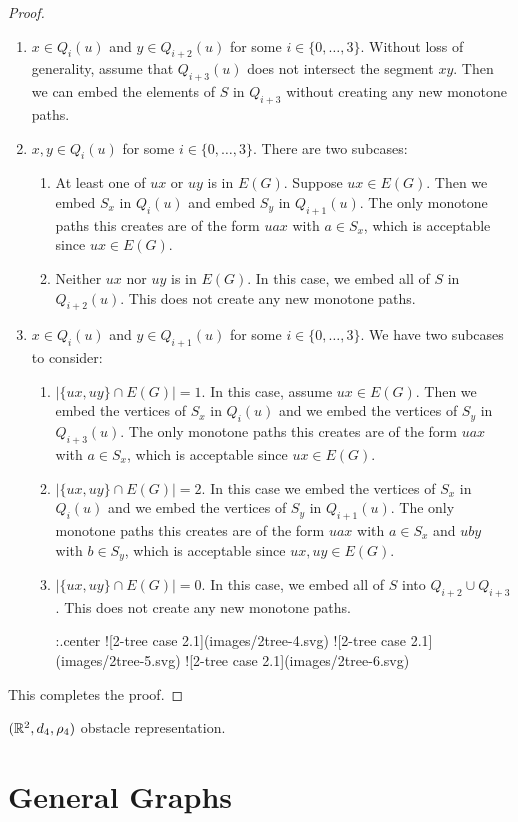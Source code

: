 \documentclass{patmorin}
\begin{document}
\begin{proof}
  \begin{enumerate}

  \item  $x\in Q_i(u)$ and $y\in Q_{i+2}(u)$ for some
  $i\in\{0,\ldots,3\}$. Without loss of generality, assume that
  $Q_{i+3}(u)$ does not intersect the segment $xy$. Then we can embed the
  elements of $S$ in $Q_{i+3}$ without creating any new monotone paths.

  \item $x,y\in Q_i(u)$ for some $i\in\{0,\ldots,3\}$. There are two subcases:
    \begin{enumerate}
    \item At least one of $ux$ or $uy$ is in $E(G)$. Suppose $ux\in E(G)$.  Then we embed $S_x$ in $Q_i(u)$ and embed $S_y$ in $Q_{i+1}(u)$.  The only monotone paths this creates are of the form $uax$ with $a\in S_x$, which is acceptable since $ux\in E(G)$.
    \item Neither $ux$ nor $uy$ is in $E(G)$. In this case, we embed all of $S$ in $Q_{i+2}(u)$.  This does not create any new monotone paths.
  \end{enumerate}

  \item $x\in Q_i(u)$ and $y\in Q_{i+1}(u)$ for some $i\in\{0,\ldots,3\}$.  We have two subcases to consider:
  \begin{enumerate}
    \item $|\{ux,uy\}\cap E(G)|=1$.  In this case, assume $ux\in E(G)$. Then we embed the vertices of $S_x$ in $Q_i(u)$ and we embed the vertices of $S_y$ in $Q_{i+3}(u)$.  The only monotone paths this creates are of the form $uax$ with $a\in S_x$, which is acceptable since $ux\in E(G)$.
    \item $|\{ux,uy\}\cap E(G)|=2$.  In this case we embed the vertices of $S_x$ in $Q_i(u)$ and we embed the vertices of $S_y$ in $Q_{i+1}(u)$.  The only monotone paths this creates are of the form $uax$ with $a\in S_x$ and $uby$ with $b\in S_y$, which is acceptable since $ux,uy\in E(G)$.
    \item $|\{ux,uy\}\cap E(G)|=0$.  In this case, we embed all of $S$ into $Q_{i+2}\cup Q_{i+3}$.  This does not create any new monotone paths.

    {:.center}
    ![2-tree case 2.1](images/2tree-4.svg)
    ![2-tree case 2.1](images/2tree-5.svg)
    ![2-tree case 2.1](images/2tree-6.svg)
\end{enumerate}
\end{enumerate}
This completes the proof.
\end{proof}

$(\mathbb{R}^2,d_4,\rho_4)$ obstacle representation.







\section{General Graphs}









\end{document}
